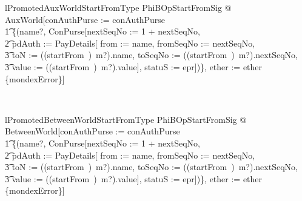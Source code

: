 \begin{LNewLemma}
\begin{theorem}{lPromotedAuxWorldStartFromType}
    \forall PhiBOpStartFromSig @ AuxWorld[conAuthPurse := conAuthPurse \\
        \t1 \oplus \{(name?, \theta ConPurse[nextSeqNo := 1 + nextSeqNo, \\
            \t2 pdAuth := \theta PayDetails[
                from := name, fromSeqNo := nextSeqNo, \\
                \t3 toN := ((startFrom~\inv)~m?).name, toSeqNo := ((startFrom~\inv)~m?).nextSeqNo, \\
                \t3 value := ((startFrom~\inv)~m?).value], statuS := epr])\}, ether := ether \cup \{mondexError\}]
\end{theorem}~\end{LNewLemma}

\begin{LNewLemma}
\begin{theorem}{lPromotedBetweenWorldStartFromType}
    \forall PhiBOpStartFromSig @ BetweenWorld[conAuthPurse := conAuthPurse \\
        \t1 \oplus \{(name?, \theta ConPurse[nextSeqNo := 1 + nextSeqNo, \\
            \t2 pdAuth := \theta PayDetails[
                from := name, fromSeqNo := nextSeqNo, \\
                \t3 toN := ((startFrom~\inv)~m?).name, toSeqNo := ((startFrom~\inv)~m?).nextSeqNo, \\
                \t3 value := ((startFrom~\inv)~m?).value], statuS := epr])\}, ether := ether \cup \{mondexError\}]
\end{theorem}~\end{LNewLemma}

